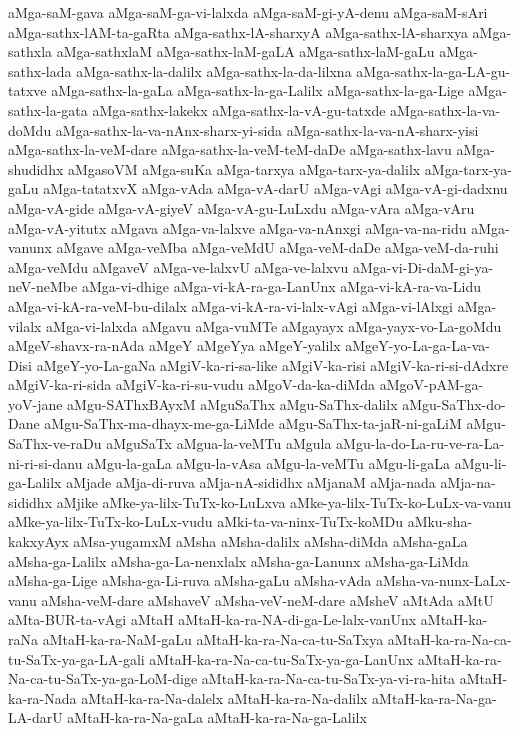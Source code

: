 {aMga-saM-gava
aMga-saM-ga-vi-lalxda
aMga-saM-gi-yA-denu
aMga-saM-sAri
aMga-sathx-lAM-ta-gaRta
aMga-sathx-lA-sharxyA
aMga-sathx-lA-sharxya
aMga-sathxla
aMga-sathxlaM
aMga-sathx-laM-gaLA
aMga-sathx-laM-gaLu
aMga-sathx-lada
aMga-sathx-la-dalilx
aMga-sathx-la-da-lilxna
aMga-sathx-la-ga-LA-gu-tatxve
aMga-sathx-la-gaLa
aMga-sathx-la-ga-Lalilx
aMga-sathx-la-ga-Lige
aMga-sathx-la-gata
aMga-sathx-lakekx
aMga-sathx-la-vA-gu-tatxde
aMga-sathx-la-va-doMdu
aMga-sathx-la-va-nAnx-sharx-yi-sida
aMga-sathx-la-va-nA-sharx-yisi
aMga-sathx-la-veM-dare
aMga-sathx-la-veM-teM-daDe
aMga-sathx-lavu
aMga-shudidhx
aMgasoVM
aMga-suKa
aMga-tarxya
aMga-tarx-ya-dalilx
aMga-tarx-ya-gaLu
aMga-tatatxvX
aMga-vAda
aMga-vA-darU
aMga-vAgi
aMga-vA-gi-dadxnu
aMga-vA-gide
aMga-vA-giyeV
aMga-vA-gu-LuLxdu
aMga-vAra
aMga-vAru
aMga-vA-yitutx
aMgava
aMga-va-lalxve
aMga-va-nAnxgi
aMga-va-na-ridu
aMga-vanunx
aMgave
aMga-veMba
aMga-veMdU
aMga-veM-daDe
aMga-veM-da-ruhi
aMga-veMdu
aMgaveV
aMga-ve-lalxvU
aMga-ve-lalxvu
aMga-vi-Di-daM-gi-ya-neV-neMbe
aMga-vi-dhige
aMga-vi-kA-ra-ga-LanUnx
aMga-vi-kA-ra-va-Lidu
aMga-vi-kA-ra-veM-bu-dilalx
aMga-vi-kA-ra-vi-lalx-vAgi
aMga-vi-lAlxgi
aMga-vilalx
aMga-vi-lalxda
aMgavu
aMga-vuMTe
aMgayayx
aMga-yayx-vo-La-goMdu
aMgeV-shavx-ra-nAda
aMgeY
aMgeYya
aMgeY-yalilx
aMgeY-yo-La-ga-La-va-Disi
aMgeY-yo-La-gaNa
aMgiV-ka-ri-sa-like
aMgiV-ka-risi
aMgiV-ka-ri-si-dAdxre
aMgiV-ka-ri-sida
aMgiV-ka-ri-su-vudu
aMgoV-da-ka-diMda
aMgoV-pAM-ga-yoV-jane
aMgu-SAThxBAyxM
aMguSaThx
aMgu-SaThx-dalilx
aMgu-SaThx-do-Dane
aMgu-SaThx-ma-dhayx-me-ga-LiMde
aMgu-SaThx-ta-jaR-ni-gaLiM
aMgu-SaThx-ve-raDu
aMguSaTx
aMgua-la-veMTu
aMgula
aMgu-la-do-La-ru-ve-ra-La-ni-ri-si-danu
aMgu-la-gaLa
aMgu-la-vAsa
aMgu-la-veMTu
aMgu-li-gaLa
aMgu-li-ga-Lalilx
aMjade
aMja-di-ruva
aMja-nA-sididhx
aMjanaM
aMja-nada
aMja-na-sididhx
aMjike
aMke-ya-lilx-TuTx-ko-LuLxva
aMke-ya-lilx-TuTx-ko-LuLx-va-vanu
aMke-ya-lilx-TuTx-ko-LuLx-vudu
aMki-ta-va-ninx-TuTx-koMDu
aMku-sha-kakxyAyx
aMsa-yugamxM
aMsha
aMsha-dalilx
aMsha-diMda
aMsha-gaLa
aMsha-ga-Lalilx
aMsha-ga-La-nenxlalx
aMsha-ga-Lanunx
aMsha-ga-LiMda
aMsha-ga-Lige
aMsha-ga-Li-ruva
aMsha-gaLu
aMsha-vAda
aMsha-va-nunx-LaLx-vanu
aMsha-veM-dare
aMshaveV
aMsha-veV-neM-dare
aMsheV
aMtAda
aMtU
aMta-BUR-ta-vAgi
aMtaH
aMtaH-ka-ra-NA-di-ga-Le-lalx-vanUnx
aMtaH-ka-raNa
aMtaH-ka-ra-NaM-gaLu
aMtaH-ka-ra-Na-ca-tu-SaTxya
aMtaH-ka-ra-Na-ca-tu-SaTx-ya-ga-LA-gali
aMtaH-ka-ra-Na-ca-tu-SaTx-ya-ga-LanUnx
aMtaH-ka-ra-Na-ca-tu-SaTx-ya-ga-LoM-dige
aMtaH-ka-ra-Na-ca-tu-SaTx-ya-vi-ra-hita
aMtaH-ka-ra-Nada
aMtaH-ka-ra-Na-dalelx
aMtaH-ka-ra-Na-dalilx
aMtaH-ka-ra-Na-ga-LA-darU
aMtaH-ka-ra-Na-gaLa
aMtaH-ka-ra-Na-ga-Lalilx
}
